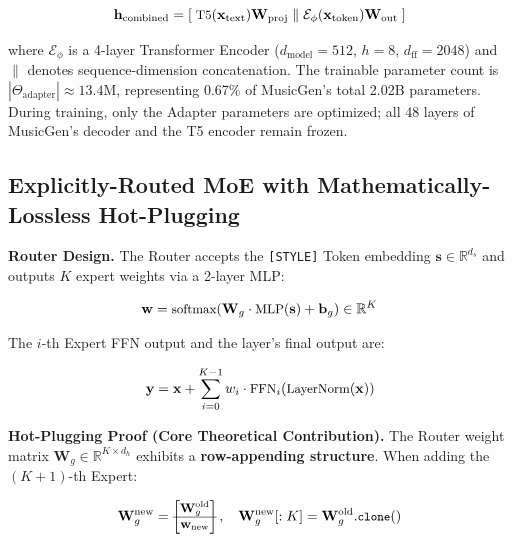 \documentclass[11pt,twocolumn]{article}
\begin{document}
\begin{equation}\small
\mathbf{h}_{\text{combined}} = [\;\text{T5}(\mathbf{x}_{\text{text}})\mathbf{W}_{\text{proj}}\;\|\;
\mathcal{E}_{\phi}(\mathbf{x}_{\text{token}})\mathbf{W}_{\text{out}}\;]
\end{equation}

where $\mathcal{E}_{\phi}$ is a 4-layer Transformer Encoder ($d_{\text{model}}=512$, $h=8$, $d_{\text{ff}}=2048$) and $\|$ denotes sequence-dimension concatenation. The trainable parameter count is $|\Theta_{\text{adapter}}| \approx 13.4$M, representing 0.67\% of MusicGen's total 2.02B parameters. During training, only the Adapter parameters are optimized; all 48 layers of MusicGen's decoder and the T5 encoder remain frozen.

\subsection{Explicitly-Routed MoE with Mathematically-Lossless Hot-Plugging}

\textbf{Router Design.} The Router accepts the \texttt{[STYLE]} Token embedding $\mathbf{s} \in \mathbb{R}^{d_s}$ and outputs $K$ expert weights via a 2-layer MLP:

\begin{equation}\small
\mathbf{w} = \text{softmax}(\mathbf{W}_g \cdot \text{MLP}(\mathbf{s}) + \mathbf{b}_g) \in \mathbb{R}^{K}
\end{equation}

The $i$-th Expert FFN output and the layer's final output are:

\begin{equation}\small
\mathbf{y} = \mathbf{x} + \sum_{i=0}^{K-1} w_i \cdot \text{FFN}_i(\text{LayerNorm}(\mathbf{x}))
\end{equation}

\textbf{Hot-Plugging Proof (Core Theoretical Contribution).}
The Router weight matrix $\mathbf{W}_g \in \mathbb{R}^{K \times d_h}$ exhibits a \textbf{row-appending structure}. When adding the $(K+1)$-th Expert:

\begin{equation}\small
\mathbf{W}_g^{\text{new}} = \begin{bmatrix}
\mathbf{W}_g^{\text{old}} \\ \hline \mathbf{w}_{\text{new}}
\end{bmatrix},\quad
\mathbf{W}_g^{\text{new}}[:K] = \mathbf{W}_g^{\text{old}}.\texttt{clone}()
\label{eq:hotplug}
\end{equation}
\end{document}
